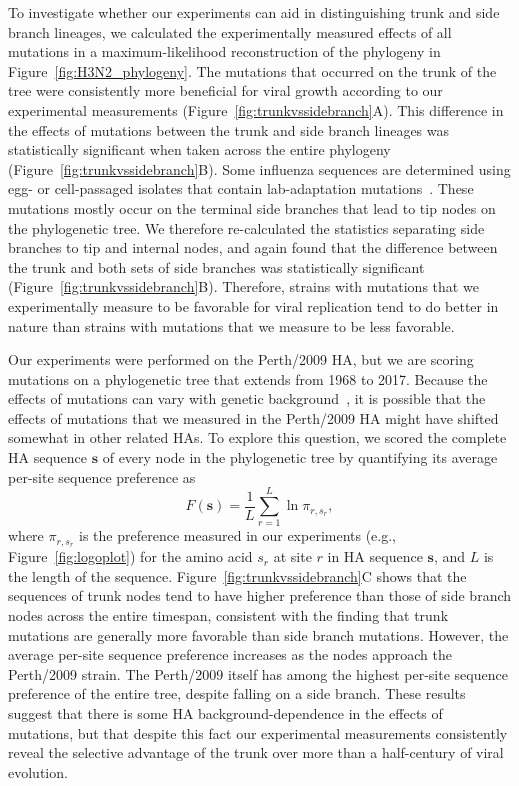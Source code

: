 \documentclass[9pt,twocolumn,twoside]{pnas-new}
\begin{document}
To investigate whether our experiments can aid in distinguishing trunk and side branch lineages, we calculated the experimentally measured effects of all mutations in a maximum-likelihood reconstruction of the phylogeny in Figure~\ref{fig:H3N2_phylogeny}.
The mutations that occurred on the trunk of the tree were consistently more beneficial for viral growth according to our experimental measurements (Figure~\ref{fig:trunkvssidebranch}A).
This difference in the effects of mutations between the trunk and side branch lineages was statistically significant when taken across the entire phylogeny (Figure~\ref{fig:trunkvssidebranch}B).
Some influenza sequences are determined using egg- or cell-passaged isolates that contain lab-adaptation mutations~\citep{wu2017structural,mcwhite2016sequence,skowronski2016mutations}.
These mutations mostly occur on the terminal side branches that lead to tip nodes on the phylogenetic tree.
We therefore re-calculated the statistics separating side branches to tip and internal nodes, and again found that the difference between the trunk and both sets of side branches was statistically significant (Figure~\ref{fig:trunkvssidebranch}B).
Therefore, strains with mutations that we experimentally measure to be favorable for viral replication tend to do better in nature than strains with mutations that we measure to be less favorable. 

Our experiments were performed on the Perth/2009 HA, but we are scoring mutations on a phylogenetic tree that extends from 1968 to 2017.
Because the effects of mutations can vary with genetic background~\cite{gong2013stability,natarajan2013epistasis,harms2014historical,starr2016epistasis,starr2017alternative}, it is possible that the effects of mutations that we measured in the Perth/2009 HA might have shifted somewhat in other related HAs.
To explore this question, we scored the complete HA sequence $\mathbf{s}$ of every node in the phylogenetic tree by quantifying its average per-site sequence preference as 
\begin{equation}
F\left(\mathbf{s}\right) = \frac{1}{L}\displaystyle\sum_{r=1}^L \ln \pi_{r, s_r},
\end{equation}
where $\pi_{r, s_r}$ is the preference measured in our experiments (e.g., Figure~\ref{fig:logoplot}) for the amino acid $s_r$ at site $r$ in HA sequence $\mathbf{s}$, and $L$ is the length of the sequence.
Figure~\ref{fig:trunkvssidebranch}C shows that the sequences of trunk nodes tend to have higher preference than those of side branch nodes across the entire timespan, consistent with the finding that trunk mutations are generally more favorable than side branch mutations. 
However, the average per-site sequence preference increases as the nodes approach the Perth/2009 strain.
The Perth/2009 itself has among the highest per-site sequence preference of the entire tree, despite falling on a side branch.
These results suggest that there is some HA background-dependence in the effects of mutations, but that despite this fact our experimental measurements consistently reveal the selective advantage of the trunk over more than a half-century of viral evolution.
\end{document}
